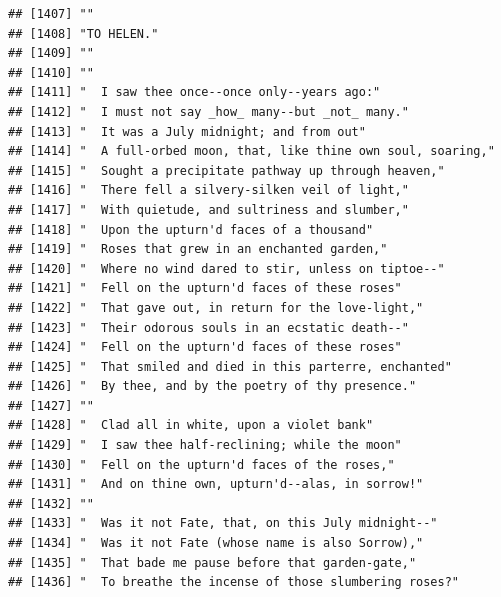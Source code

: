 \documentclass{article}\usepackage[]{graphicx}\usepackage[]{color}
\makeatletter
\newenvironment{kframe}{%
 \def\at@end@of@kframe{}%
 \ifinner\ifhmode%
  \def\at@end@of@kframe{\end{minipage}}%
  \begin{minipage}{\columnwidth}%
 \fi\fi%
 \def\FrameCommand##1{\hskip\@totalleftmargin \hskip-\fboxsep
 \colorbox{shadecolor}{##1}\hskip-\fboxsep
     \hskip-\linewidth \hskip-\@totalleftmargin \hskip\columnwidth}%
 \MakeFramed {\advance\hsize-\width
   \@totalleftmargin\z@ \linewidth\hsize
   \@setminipage}}%
 {\par\unskip\endMakeFramed%
 \at@end@of@kframe}
\newenvironment{knitrout}{}{} %
\makeatother
\begin{document}
\begin{knitrout}
\begin{kframe}
\begin{verbatim}
## [1407] ""                                                                            
## [1408] "TO HELEN."                                                                   
## [1409] ""                                                                            
## [1410] ""                                                                            
## [1411] "  I saw thee once--once only--years ago:"                                    
## [1412] "  I must not say _how_ many--but _not_ many."                                
## [1413] "  It was a July midnight; and from out"                                      
## [1414] "  A full-orbed moon, that, like thine own soul, soaring,"                    
## [1415] "  Sought a precipitate pathway up through heaven,"                           
## [1416] "  There fell a silvery-silken veil of light,"                                
## [1417] "  With quietude, and sultriness and slumber,"                                
## [1418] "  Upon the upturn'd faces of a thousand"                                     
## [1419] "  Roses that grew in an enchanted garden,"                                   
## [1420] "  Where no wind dared to stir, unless on tiptoe--"                           
## [1421] "  Fell on the upturn'd faces of these roses"                                 
## [1422] "  That gave out, in return for the love-light,"                              
## [1423] "  Their odorous souls in an ecstatic death--"                                
## [1424] "  Fell on the upturn'd faces of these roses"                                 
## [1425] "  That smiled and died in this parterre, enchanted"                          
## [1426] "  By thee, and by the poetry of thy presence."                               
## [1427] ""                                                                            
## [1428] "  Clad all in white, upon a violet bank"                                     
## [1429] "  I saw thee half-reclining; while the moon"                                 
## [1430] "  Fell on the upturn'd faces of the roses,"                                  
## [1431] "  And on thine own, upturn'd--alas, in sorrow!"                              
## [1432] ""                                                                            
## [1433] "  Was it not Fate, that, on this July midnight--"                            
## [1434] "  Was it not Fate (whose name is also Sorrow),"                              
## [1435] "  That bade me pause before that garden-gate,"                               
## [1436] "  To breathe the incense of those slumbering roses?"                         

\end{verbatim}
\end{kframe}
\end{knitrout}
\end{document}
